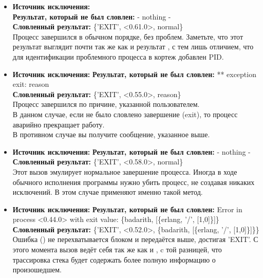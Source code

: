 \begin{itemize}
    \item \textbf{Источник исключения:} \\
    \textbf{Результат, который не был словлен:} - nothing -\\
    \textbf{Словленный результат:} \{'EXIT', <0.61.0>, normal\}\\
    Процесс завершился в обычном порядке, без проблем.
    Заметьте, что этот результат выглядит почти так же как и результат , с тем лишь отличием, что для идентификации проблемного процесса в кортеж добавлен PID.\\
    \item \textbf{Источник исключения:} 
    \textbf{Результат, который не был словлен:} ** exception exit: reason\\
    \textbf{Словленный результат:} \{'EXIT', <0.55.0>, reason\}\\
    Процесс завершился по причине, указанной пользователем.\\
    В данном случае, если не было словлено завершение (exit), то процесс аварийно прекращает работу.\\
    В противном случае вы получите сообщение, указанное выше.\\
    \item \textbf{Источник исключения:} 
    \textbf{Результат, который не был словлен:} - nothing -\\
    \textbf{Словленный результат:} \{'EXIT', <0.58.0>, normal\}\\
    Этот вызов эмулирует нормальное завершение процесса.
    Иногда в ходе обычного  исполнения программы нужно убить процесс, не создавая никаких исключений.
    В этом  случае применяют именно такой метод.\\
    \item \textbf{Источник исключения:} 
    \textbf{Результат, который не был словлен:} Error in process <0.44.0> with exit value: \{badarith, [\{erlang, '/', [1,0]\}]\}\\
    \textbf{Словленный результат:} \{'EXIT', <0.52.0>, \{badarith, [\{erlang, '/', [1,0]\}]\}\}\\
    Ошибка () не перехватывается блоком  и передаётся выше, достигая 'EXIT'.
    С этого момента вызов ведёт себя так же как и , c той разницей, что трассировка стека будет содержать более полную информацию о произошедшем.\\

\end{itemize}
